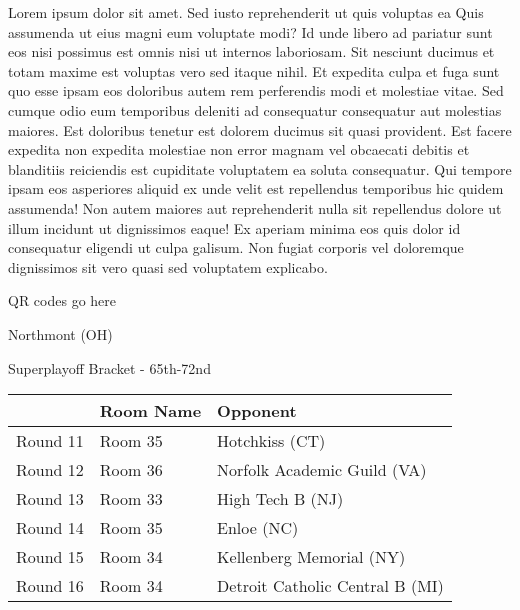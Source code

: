 \documentclass{article}%
\begin{document}
\vspace*{8pt}%
\linebreak%
\newline%
\newline%
    Lorem ipsum dolor sit amet. Sed iusto reprehenderit ut quis voluptas ea Quis assumenda ut eius magni eum voluptate modi? Id unde libero ad pariatur sunt eos nisi possimus est omnis nisi ut internos laboriosam. Sit nesciunt ducimus et totam maxime est voluptas vero sed itaque nihil. Et expedita culpa et fuga sunt quo esse ipsam eos doloribus autem rem perferendis modi et molestiae vitae.\newline%
\newline%
    Sed cumque odio eum temporibus deleniti ad consequatur consequatur aut molestias maiores. Est doloribus tenetur est dolorem ducimus sit quasi provident. Est facere expedita non expedita molestiae non error magnam vel obcaecati debitis et blanditiis reiciendis est cupiditate voluptatem ea soluta consequatur. Qui tempore ipsam eos asperiores aliquid ex unde velit est repellendus temporibus hic quidem assumenda!\newline%
\newline%
    Non autem maiores aut reprehenderit nulla sit repellendus dolore ut illum incidunt ut dignissimos eaque! Ex aperiam minima eos quis dolor id consequatur eligendi ut culpa galisum. Non fugiat corporis vel doloremque dignissimos sit vero quasi sed voluptatem explicabo.\newline%
\newline%
\vspace*{30pt}%
\begin{center}%
\begin{Huge}%
QR codes go here%
\end{Huge}%
\end{center}%
\newpage%
\begin{center}%
\begin{Huge}%
Northmont (OH)%
\end{Huge}%
\vspace*{8pt}%
\linebreak%
\begin{Large}%
Superplayoff Bracket {-} 65th{-}72nd%
\end{Large}%
\end{center}%
%
\begin{tabularx}{\textwidth}{|c|Y|Y|}%
\hline%
&Room Name&Opponent\\%
\hline%
Round 11&Room 35&Hotchkiss (CT)\\%
Round 12&Room 36&Norfolk Academic Guild (VA)\\%
Round 13&Room 33&High Tech B (NJ)\\%
Round 14&Room 35&Enloe (NC)\\%
Round 15&Room 34&Kellenberg Memorial (NY)\\%
Round 16&Room 34&Detroit Catholic Central B (MI)\\%
\hline%
\end{tabularx}%
\end{document}
